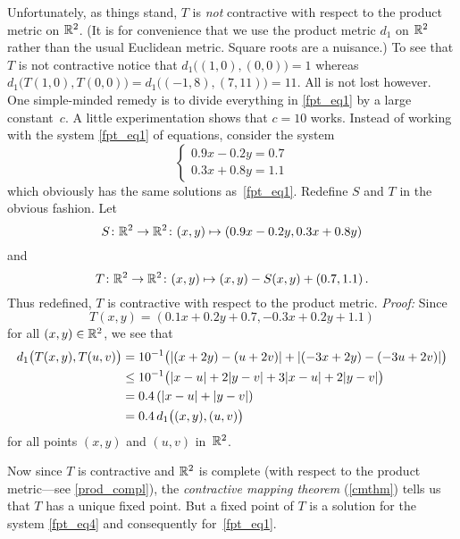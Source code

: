 \begin{exam}
Unfortunately, as things stand, $T$ is \emph{not} contractive with respect to the product metric on
$\mathbb{R}^2$.  (It is for convenience that we use the product metric $d_1$ on $\mathbb{R}^2$ rather than the
usual Euclidean metric.  Square roots are a nuisance.)  To see that $T$ is not contractive notice
that $d_1\bigl((1,0),(0,0)\bigr) = 1$ whereas $d_1\bigl(T(1,0),T(0,0)\bigr) =
d_1\bigl((-1,8),(7,11)\bigr) = 11$.  All is not lost however.  One simple-minded remedy is to
divide everything in \eqref{fpt_eq1} by a large constant~$c$.  A little experimentation shows that
$c = 10$ works.  Instead of working with the system \eqref{fpt_eq1} of equations, consider the
system
  \begin{equation}\label{fpt_eq4}
           \left\{     \begin{aligned}    0.9 x - 0.2 y = 0.7 \\
                                          0.3 x + 0.8 y = 1.1
                       \end{aligned}
           \right.
  \end{equation}
which obviously has the same solutions as~\eqref{fpt_eq1}. Redefine $S$ and $T$ in the obvious
fashion. Let
  \[ S \colon \mathbb{R}^2 \rightarrow \mathbb{R}^2 \colon (x,y) \mapsto (0.9x - 0.2y, 0.3x + 0.8y) \]
and
  \[ T \colon \mathbb{R}^2 \rightarrow \mathbb{R}^2 \colon (x,y) \mapsto (x,y) - S(x,y) + (0.7,1.1)\,. \]
Thus redefined, $T$ is contractive with respect to the product metric.  \emph{Proof:} Since
  \begin{equation}\label{fpt_eq5}
         T(x,y) = (0.1 x + 0.2 y + 0.7, -0.3 x + 0.2 y + 1.1)
  \end{equation}
for all $(x,y) \in \mathbb{R}^2$, we see that
  \begin{align}
    d_1\bigl(T(x,y),T(u,v)\bigr)
        &= 10^{-1}\bigl(\lvert(x+2y)-(u+2v)\rvert + \lvert(-3x+2y)-(-3u+2v)\rvert\bigr) \notag \\
        &\le 10^{-1}\bigl(\lvert x-u\rvert + 2\lvert y-v\rvert + 3\lvert x-u\rvert + 2\lvert y-v\rvert\bigr) \notag \\
        &= 0.4\,(\lvert x-u\rvert + \lvert y-v\rvert) \notag \\
        &= 0.4\,d_1\bigl((x,y),(u,v)\bigr) \label{fpt_eq6}
  \end{align}
for all points $(x,y)$ and $(u,v)$ in~$\mathbb{R}^2$.

Now since $T$ is contractive and $\mathbb{R}^2$ is complete (with respect to the product metric---see
\ref{prod_compl}), the \emph{contractive mapping theorem} (\ref{cmthm}) tells us that $T$ has a
unique fixed point.  But a fixed point of $T$ is a solution for the system \eqref{fpt_eq4} and
consequently for~\eqref{fpt_eq1}.


\end{exam}
